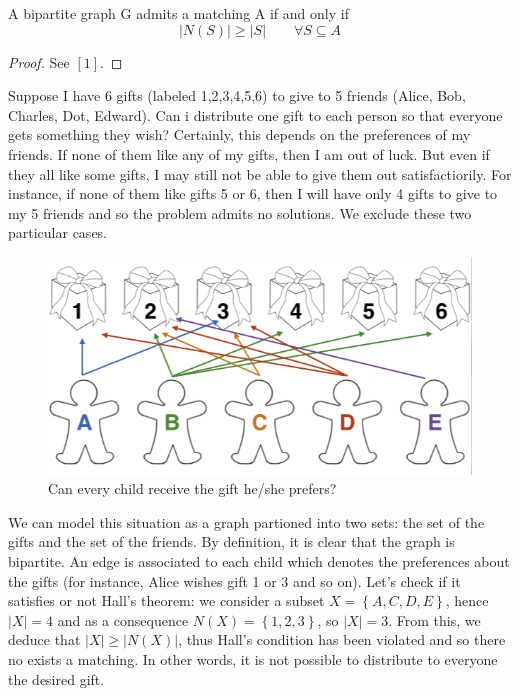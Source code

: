 \begin{theorem}[Hall, 1935]
A bipartite graph G admits a matching A if and only if
\begin{equation*}
|N(S)| \ge |S| \qquad \forall S \subseteq A
\end{equation*}
\end{theorem}
\begin{proof}
See $[1]$.
\end{proof}

\begin{example}
Suppose I have 6 gifts (labeled 1,2,3,4,5,6) to give to 5 friends (Alice, Bob, Charles, Dot, Edward). Can i distribute one gift to each person so that everyone gets something they wish? Certainly, this depends on the preferences of my friends. If none of them like any of my gifts, then I am out of luck. But even if they all like some gifts, I may still not be able to give them out satisfactiorily. For instance, if none of them like gifts 5 or 6, then I will have only 4 gifts to give to my 5 friends and so the problem admits no solutions. We exclude these two particular cases.

\begin{figure}[htbp]
\centering
\includegraphics[width=.60\textwidth]{bambini.png}
\caption{Can every child receive the gift he/she prefers?}
\end{figure}

We can model this situation as a graph partioned into two sets: the set of the gifts and the set of the friends. By definition, it is clear that the graph is bipartite. An edge is associated to each child which denotes the preferences about the gifts (for instance, Alice wishes gift 1 or 3 and so on). Let's check if it satisfies or not Hall's theorem: we consider a subset $X = \left \{ A,C,D,E \right \}$, hence $|X| = 4$ and as a consequence $N(X) = \left \{ 1,2,3 \right \}$, so $|X| = 3$. From this, we deduce that $|X| \ge |N(X)|$, thus Hall's condition has been violated and so there no exists a matching. In other words, it is not possible to distribute to everyone the desired gift.
\end{example}

